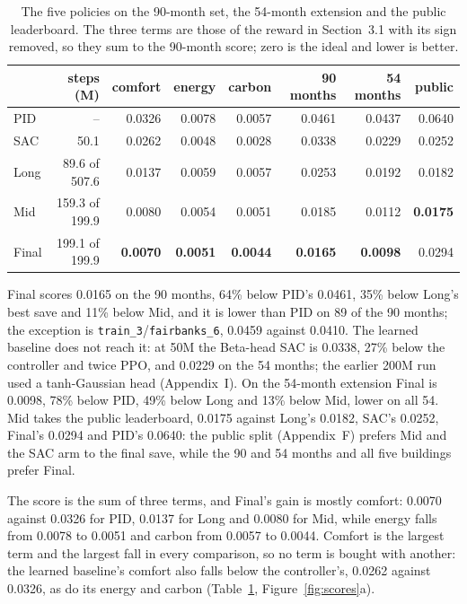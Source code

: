 \documentclass{article}
\begin{document}
\begin{table}[h!]
\centering
\small
\setlength{\tabcolsep}{4.0pt}
\begin{tabular}{@{}lrrrrrrr@{}}
\toprule
 & steps (M) & comfort & energy & carbon & 90 months & 54 months & public \\
\midrule
PID & -- & 0.0326 & 0.0078 & 0.0057 & 0.0461 & 0.0437 & 0.0640 \\
SAC & 50.1 & 0.0262 & 0.0048 & 0.0028 & 0.0338 & 0.0229 & 0.0252 \\
Long & 89.6 of 507.6 & 0.0137 & 0.0059 & 0.0057 & 0.0253 & 0.0192 & 0.0182 \\
Mid & 159.3 of 199.9 & 0.0080 & 0.0054 & 0.0051 & 0.0185 & 0.0112 & \textbf{0.0175} \\
Final & 199.1 of 199.9 & \textbf{0.0070} & \textbf{0.0051} & \textbf{0.0044} & \textbf{0.0165} & \textbf{0.0098} & 0.0294 \\
\bottomrule
\end{tabular}
\vspace{4pt}
\caption{The five policies on the 90-month set, the 54-month extension and the public leaderboard. The three terms are those of the reward in Section~3.1 with its sign removed, so they sum to the 90-month score; zero is the ideal and lower is better.}
\label{tab:score}
\end{table}


Final scores 0.0165 on the 90 months, 64\% below PID's 0.0461, 35\% below Long's best save and 11\% below Mid, and it is lower than PID on 89 of the 90 months; the exception is \texttt{train\_3}/\texttt{fairbanks\_6}, 0.0459 against 0.0410. The learned baseline does not reach it: at 50M the Beta-head SAC is 0.0338, 27\% below the controller and twice PPO, and 0.0229 on the 54 months; the earlier 200M run used a tanh-Gaussian head (Appendix~I). On the 54-month extension Final is 0.0098, 78\% below PID, 49\% below Long and 13\% below Mid, lower on all 54. Mid takes the public leaderboard, 0.0175 against Long's 0.0182, SAC's 0.0252, Final's 0.0294 and PID's 0.0640: the public split (Appendix~F) prefers Mid and the SAC arm to the final save, while the 90 and 54 months and all five buildings prefer Final.


The score is the sum of three terms, and Final's gain is mostly comfort: 0.0070 against 0.0326 for PID, 0.0137 for Long and 0.0080 for Mid, while energy falls from 0.0078 to 0.0051 and carbon from 0.0057 to 0.0044. Comfort is the largest term and the largest fall in every comparison, so no term is bought with another: the learned baseline's comfort also falls below the controller's, 0.0262 against 0.0326, as do its energy and carbon (Table~\ref{tab:score}, Figure~\ref{fig:scores}a).
\end{document}
